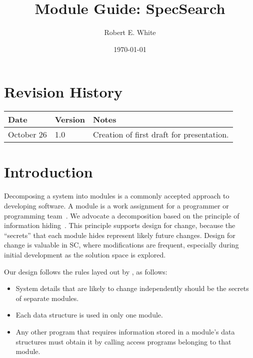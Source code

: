 \documentclass[12pt, titlepage]{article}
\begin{document}
\title{Module Guide: SpecSearch} 
\author{Robert E. White}
\date{\today}

\maketitle
\section{Revision History}

\begin{tabularx}{\textwidth}{p{3cm}p{2cm}X}
\toprule {\bf Date} & {\bf Version} & {\bf Notes}\\
\midrule
October 26 & 1.0 & Creation of first draft for presentation.\\
\bottomrule
\end{tabularx}

\newpage

\tableofcontents

\listoftables

\listoffigures

\newpage


\section{Introduction}

Decomposing a system into modules is a commonly accepted approach to developing
software.  A module is a work assignment for a programmer or programming
team~\citep{ParnasEtAl1984}.  We advocate a decomposition
based on the principle of information hiding~\citep{Parnas1972a}.  This
principle supports design for change, because the ``secrets'' that each module
hides represent likely future changes.  Design for change is valuable in SC,
where modifications are frequent, especially during initial development as the
solution space is explored.  

Our design follows the rules layed out by \citet{ParnasEtAl1984}, as follows:
\begin{itemize}
\item System details that are likely to change independently should be the
  secrets of separate modules.
\item Each data structure is used in only one module.
\item Any other program that requires information stored in a module's data
  structures must obtain it by calling access programs belonging to that module.
\end{itemize}
\end{document}
